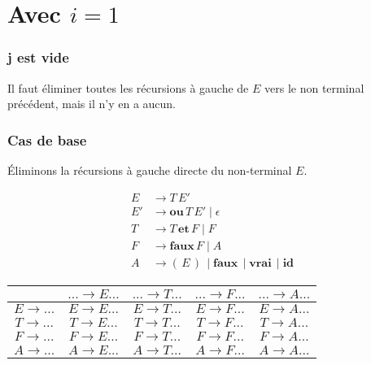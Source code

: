 \documentclass[class=article]{standalone}
\begin{document}
\section*{Avec $i = 1$}
\subsubsection*{j est vide}
Il faut éliminer toutes les récursions à gauche de $E$ vers le non terminal précédent,
mais il n'y en a aucun.

\subsubsection*{Cas de base}
Éliminons la récursions à gauche directe du non-terminal $E$.

\begin{align*}
    E &\rightarrow T \, E'\\
    E'&\rightarrow \textbf{ou} \, T \, E' \mid \epsilon\\
    T &\rightarrow T \, \textbf{et} \, F \mid F\\
    F &\rightarrow \textbf{faux} \, F \mid A\\
    A &\rightarrow ( \, E \, ) \, \mid \textbf{faux} \, \mid \textbf{vrai} \, \mid \textbf{id}
\end{align*}
\begin{center}
    \begin{tabular}{c|c|c|c|c|}
        \cellcolor[HTML]{FFFFFF}                     & 
        \cellcolor[HTML]{FFFFFF} $... \rightarrow E...$ &
        \cellcolor[HTML]{FFFFFF} $... \rightarrow T...$ & 
        \cellcolor[HTML]{FFFFFF} $... \rightarrow F...$ & 
        \cellcolor[HTML]{FFFFFF} $... \rightarrow A...$ \\
    \hline
        \cellcolor[HTML]{FFFFFF} $E \rightarrow ...$ & 
        \cellcolor[HTML]{FF0000} $E \rightarrow E...$ & 
        \cellcolor[HTML]{ABFF00} $E \rightarrow T...$ & 
        \cellcolor[HTML]{ABFF00} $E \rightarrow F...$ & 
        \cellcolor[HTML]{ABFF00} $E \rightarrow A...$ \\
    \hline
        \cellcolor[HTML]{FFFFFF} $T \rightarrow ...$ & 
        \cellcolor[HTML]{FFFFFF} $T \rightarrow E...$ & 
        \cellcolor[HTML]{FFFFFF} $T \rightarrow T...$ & 
        \cellcolor[HTML]{ABFF00} $T \rightarrow F...$ &
        \cellcolor[HTML]{ABFF00} $T \rightarrow A...$ \\
    \hline
        \cellcolor[HTML]{FFFFFF} $F \rightarrow ...$ &
        \cellcolor[HTML]{FFFFFF} $F \rightarrow E...$ &
        \cellcolor[HTML]{FFFFFF} $F \rightarrow T...$ & 
        \cellcolor[HTML]{FFFFFF} $F \rightarrow F...$ & 
        \cellcolor[HTML]{ABFF00} $F \rightarrow A...$ \\
    \hline
        \cellcolor[HTML]{FFFFFF} $A \rightarrow ...$ & 
        \cellcolor[HTML]{FFFFFF} $A \rightarrow E...$ & 
        \cellcolor[HTML]{FFFFFF} $A \rightarrow T...$ & 
        \cellcolor[HTML]{FFFFFF} $A \rightarrow F...$ & 
        \cellcolor[HTML]{FFFFFF} $A \rightarrow A...$ \\
    \hline
    \end{tabular}
\end{center}
\end{document}
